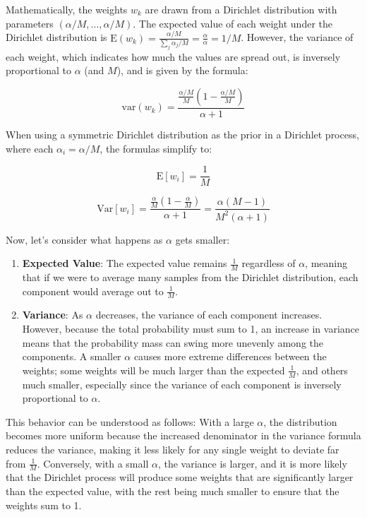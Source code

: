 \documentclass[10pt]{article}
\begin{document}
Mathematically, the weights \( w_k \) are drawn from a Dirichlet distribution with parameters \( (\alpha/M, \ldots, \alpha/M) \). The expected value of each weight under the Dirichlet distribution is \( \mathrm{E}(w_k) = \frac{\alpha/M}{\sum_{j} \alpha_j/M} = \frac{\alpha}{\alpha} = 1/M \). However, the variance of each weight, which indicates how much the values are spread out, is inversely proportional to \( \alpha \) (and \( M \)), and is given by the formula:

\[ \text{var}(w_k) = \frac{\frac{\alpha/M}{M}(1 - \frac{\alpha/M}{M})}{\alpha + 1} \]

When using a symmetric Dirichlet distribution as the prior in a Dirichlet process, where each \( \alpha_i = \alpha/M \), the formulas simplify to:

\[ \mathrm{E}[w_i] = \frac{1}{M} \]

\[ \mathrm{Var}[w_i] = \frac{\frac{\alpha}{M} (1 - \frac{\alpha}{M})}{\alpha + 1} = \frac{\alpha (M - 1)}{M^2 (\alpha + 1)} \]

Now, let's consider what happens as \( \alpha \) gets smaller:

\begin{enumerate}
  \item \textbf{Expected Value}: The expected value remains \( \frac{1}{M} \) regardless of \( \alpha \), meaning that if we were to average many samples from the Dirichlet distribution, each component would average out to \( \frac{1}{M} \).

  \item \textbf{Variance}: As \( \alpha \) decreases, the variance of each component increases. However, because the total probability must sum to 1, an increase in variance means that the probability mass can swing more unevenly among the components. A smaller \( \alpha \) causes more extreme differences between the weights; some weights will be much larger than the expected \( \frac{1}{M} \), and others much smaller, especially since the variance of each component is inversely proportional to \( \alpha \).

\end{enumerate}

This behavior can be understood as follows: With a large \( \alpha \), the distribution becomes more uniform because the increased denominator in the variance formula reduces the variance, making it less likely for any single weight to deviate far from \( \frac{1}{M} \). Conversely, with a small \( \alpha \), the variance is larger, and it is more likely that the Dirichlet process will produce some weights that are significantly larger than the expected value, with the rest being much smaller to ensure that the weights sum to 1.
\end{document}

